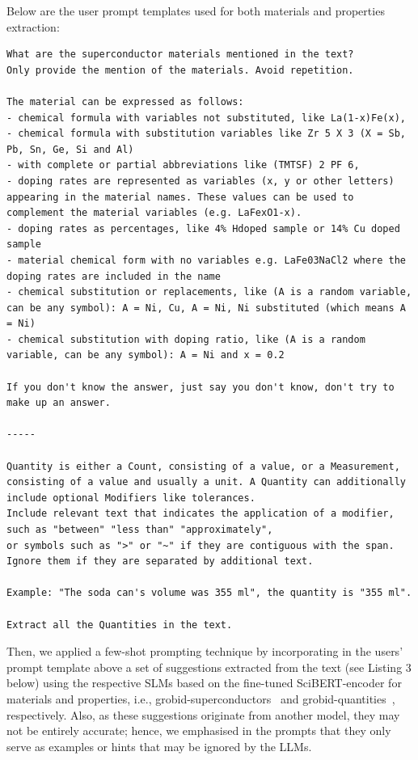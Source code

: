 Below are the user prompt templates used for both materials and properties extraction: 

\begin{lstlisting}[caption=User prompt designed for extracting materials and properties. They are separated by "------".]
What are the superconductor materials mentioned in the text? 
Only provide the mention of the materials. Avoid repetition. 

The material can be expressed as follows:
- chemical formula with variables not substituted, like La(1-x)Fe(x),
- chemical formula with substitution variables like Zr 5 X 3 (X = Sb, Pb, Sn, Ge, Si and Al)
- with complete or partial abbreviations like (TMTSF) 2 PF 6,
- doping rates are represented as variables (x, y or other letters) appearing in the material names. These values can be used to complement the material variables (e.g. LaFexO1-x).
- doping rates as percentages, like 4% Hdoped sample or 14% Cu doped sample
- material chemical form with no variables e.g. LaFe03NaCl2 where the doping rates are included in the name
- chemical substitution or replacements, like (A is a random variable, can be any symbol): A = Ni, Cu, A = Ni, Ni substituted (which means A = Ni)
- chemical substitution with doping ratio, like (A is a random variable, can be any symbol): A = Ni and x = 0.2

If you don't know the answer, just say you don't know, don't try to make up an answer.

-----

Quantity is either a Count, consisting of a value, or a Measurement, 
consisting of a value and usually a unit. A Quantity can additionally include optional Modifiers like tolerances.
Include relevant text that indicates the application of a modifier, such as "between" "less than" "approximately", 
or symbols such as ">" or "~" if they are contiguous with the span. Ignore them if they are separated by additional text.
 
Example: "The soda can's volume was 355 ml", the quantity is "355 ml".

Extract all the Quantities in the text.
\end{lstlisting}

Then, we applied a few-shot prompting technique by incorporating in the users' prompt template above a set of suggestions extracted from the text (see Listing 3 below) using the respective SLMs based on the fine-tuned SciBERT-encoder for materials and properties, i.e., grobid-superconductors~\cite{lfoppiano2023automatic} and grobid-quantities~\cite{foppiano2019quantities}, respectively. Also, as these suggestions originate from another model, they may not be entirely accurate; hence, we emphasised in the prompts that they only serve as examples or hints that may be ignored by the LLMs.  

